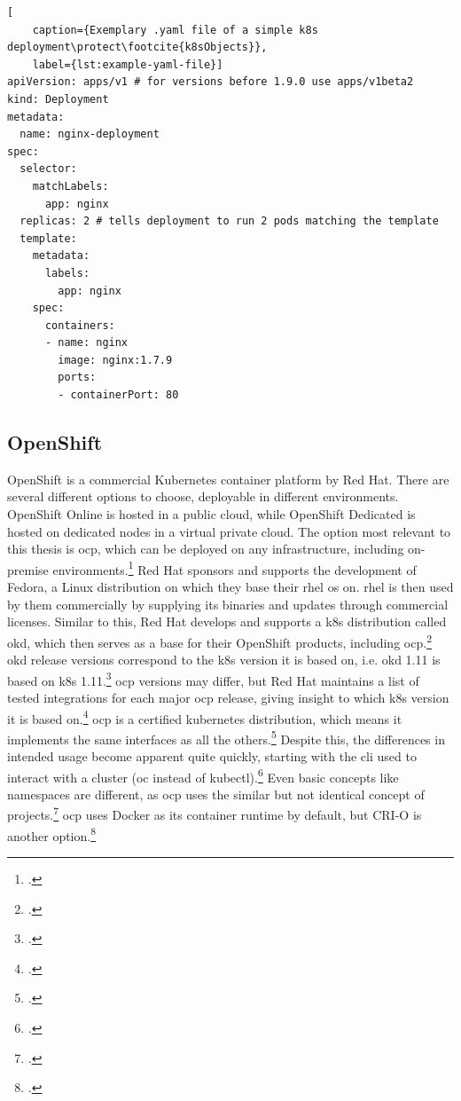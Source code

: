 \begin{lstlisting}[
	caption={Exemplary .yaml file of a simple k8s deployment\protect\footcite{k8sObjects}},
	label={lst:example-yaml-file}]
apiVersion: apps/v1 # for versions before 1.9.0 use apps/v1beta2
kind: Deployment
metadata:
  name: nginx-deployment
spec:
  selector:
    matchLabels:
      app: nginx
  replicas: 2 # tells deployment to run 2 pods matching the template
  template:
    metadata:
      labels:
        app: nginx
    spec:
      containers:
      - name: nginx
        image: nginx:1.7.9
        ports:
        - containerPort: 80
\end{lstlisting}


\subsection{OpenShift} \label{openshiftExplanation}

OpenShift is a commercial Kubernetes container platform by Red Hat. There are several different options to choose, deployable in different environments. OpenShift Online is hosted in a public cloud, while OpenShift Dedicated is hosted on dedicated nodes in a virtual private cloud. The option most relevant to this thesis is \gls{ocp}, which can be deployed on any infrastructure, including on-premise environments.\footcite[][, section 'OpenShift plans and pricing']{openShiftOptions}
Red Hat sponsors and supports the development of Fedora, a Linux distribution on which they base their \gls{rhel} \gls{os} on. \gls{rhel} is then used by them commercially by supplying its binaries and updates through commercial licenses.
Similar to this, Red Hat develops and supports a \gls{k8s} distribution called \gls{okd}, which then serves as a base for their OpenShift products, including \gls{ocp}.\footcite[][, section 'OKD vs Red Hat OpenShift']{ocpVsOkd}
\gls{okd} release versions correspond to the \gls{k8s} version it is based on, i.e. \gls{okd} 1.11 is based on \gls{k8s} 1.11.\footcite[][, section 'What is OKD?']{okd}
\gls{ocp} versions may differ, but Red Hat maintains a list of tested integrations for each major \gls{ocp} release, giving insight to which \gls{k8s} version it is based on.\footcite[][, table 'Platform Components']{ocpK8sVersions}
\gls{ocp} is a certified kubernetes distribution, which means it implements the same interfaces as all the others.\footcite[][, table 'Platform - Certified Kubernetes - Distribution']{certifiedK8s}
Despite this, the differences in intended usage become apparent quite quickly, starting with the \gls{cli} used to interact with a cluster (oc instead of kubectl).\footcite[][, section 'Basic Setup and Login']{ocpCli}
Even basic concepts like namespaces are different, as \gls{ocp} uses the similar but not identical concept of projects.\footcite[][, section 'Overview']{ocpProjects}
\gls{ocp} uses Docker as its container runtime by default, but CRI-O is another option.\footcite[][, section 'Getting CRI-O']{ocpCrio}

